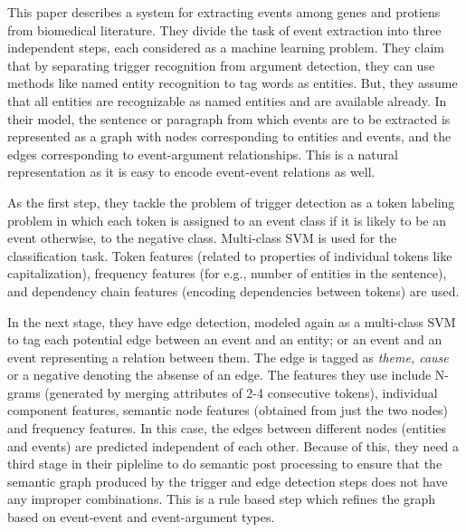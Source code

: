 

This paper describes a system for extracting events among genes and protiens from biomedical literature. They divide the task of event extraction into three independent steps, each considered as a machine learning problem. They claim that by separating trigger recognition from argument detection, they can use methods like named entity recognition to tag words as entities. But, they assume that all entities are recognizable as named entities and are available already. In their model, the sentence or paragraph from which events are to be extracted is represented as a graph with nodes corresponding to entities and events, and the edges corresponding to event-argument relationships. This is a natural representation as it is easy to encode event-event relations as well. 

As the first step, they tackle the problem of trigger detection as a token labeling problem in which each token is assigned to an event class if it is likely to be an event otherwise, to the negative class. Multi-class SVM is used for the classification task. Token features (related to properties of individual tokens like capitalization), frequency features (for e.g., number of entities in the sentence), and dependency chain features (encoding dependencies between tokens) are used. 

In the next stage, they have edge detection, modeled again as a multi-class SVM to tag each potential edge between an event and an entity; or an event and an event representing a relation between them. The edge is tagged as {\em theme, cause} or a negative denoting the absense of an edge. The features they use include N-grams (generated by merging attributes of 2-4 consecutive tokens), individual component features, semantic node features (obtained from just the two nodes) and frequency features. In this case, the edges between different nodes (entities and events) are predicted independent of each other. Because of this, they need a third stage in their pipleline to do semantic post processing to ensure that the semantic graph produced by the trigger and edge detection steps does not have any improper combinations. This is a rule based step which refines the graph based on event-event and event-argument types. \\


